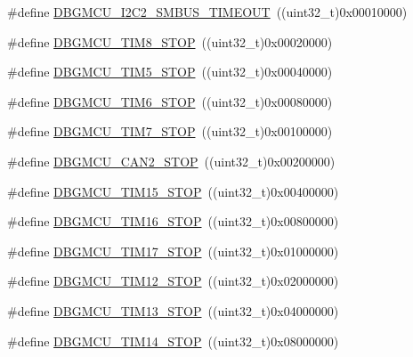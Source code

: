 \begin{DoxyCompactItemize}
\item 
\#define \hyperlink{group___d_b_g_m_c_u___exported___constants_ga316f8eba36b7a796dd3c6b7d6640b4bf}{D\+B\+G\+M\+C\+U\+\_\+\+I2\+C2\+\_\+\+S\+M\+B\+U\+S\+\_\+\+T\+I\+M\+E\+O\+UT}~((uint32\+\_\+t)0x00010000)
\item 
\#define \hyperlink{group___d_b_g_m_c_u___exported___constants_gaa66feea7d5f2c253fe3f431f9dd4bd1e}{D\+B\+G\+M\+C\+U\+\_\+\+T\+I\+M8\+\_\+\+S\+T\+OP}~((uint32\+\_\+t)0x00020000)
\item 
\#define \hyperlink{group___d_b_g_m_c_u___exported___constants_gaf97e21534b3aa9482af496497a37ff4b}{D\+B\+G\+M\+C\+U\+\_\+\+T\+I\+M5\+\_\+\+S\+T\+OP}~((uint32\+\_\+t)0x00040000)
\item 
\#define \hyperlink{group___d_b_g_m_c_u___exported___constants_ga076cf7d18c7019e99f5f15962ab317eb}{D\+B\+G\+M\+C\+U\+\_\+\+T\+I\+M6\+\_\+\+S\+T\+OP}~((uint32\+\_\+t)0x00080000)
\item 
\#define \hyperlink{group___d_b_g_m_c_u___exported___constants_gaf593ca16ee6d3f1fabc549878f3f87f0}{D\+B\+G\+M\+C\+U\+\_\+\+T\+I\+M7\+\_\+\+S\+T\+OP}~((uint32\+\_\+t)0x00100000)
\item 
\#define \hyperlink{group___d_b_g_m_c_u___exported___constants_gace53677f1b7b9a52b592cf2b0f3f7178}{D\+B\+G\+M\+C\+U\+\_\+\+C\+A\+N2\+\_\+\+S\+T\+OP}~((uint32\+\_\+t)0x00200000)
\item 
\#define \hyperlink{group___d_b_g_m_c_u___exported___constants_ga68f2b4e7feb0a1f1e4b437a104c30f03}{D\+B\+G\+M\+C\+U\+\_\+\+T\+I\+M15\+\_\+\+S\+T\+OP}~((uint32\+\_\+t)0x00400000)
\item 
\#define \hyperlink{group___d_b_g_m_c_u___exported___constants_ga8a0698403a9c76115bc607ee0149193f}{D\+B\+G\+M\+C\+U\+\_\+\+T\+I\+M16\+\_\+\+S\+T\+OP}~((uint32\+\_\+t)0x00800000)
\item 
\#define \hyperlink{group___d_b_g_m_c_u___exported___constants_gabf3a93a60431c892bdf36ff02081badc}{D\+B\+G\+M\+C\+U\+\_\+\+T\+I\+M17\+\_\+\+S\+T\+OP}~((uint32\+\_\+t)0x01000000)
\item 
\#define \hyperlink{group___d_b_g_m_c_u___exported___constants_ga4814287cef24f57e795b0f5b0174b49c}{D\+B\+G\+M\+C\+U\+\_\+\+T\+I\+M12\+\_\+\+S\+T\+OP}~((uint32\+\_\+t)0x02000000)
\item 
\#define \hyperlink{group___d_b_g_m_c_u___exported___constants_gae0dd8a28977b261b013fa1ecda79b289}{D\+B\+G\+M\+C\+U\+\_\+\+T\+I\+M13\+\_\+\+S\+T\+OP}~((uint32\+\_\+t)0x04000000)
\item 
\#define \hyperlink{group___d_b_g_m_c_u___exported___constants_ga731f63d66045abee68dbc634070df051}{D\+B\+G\+M\+C\+U\+\_\+\+T\+I\+M14\+\_\+\+S\+T\+OP}~((uint32\+\_\+t)0x08000000)

\end{DoxyCompactItemize}
